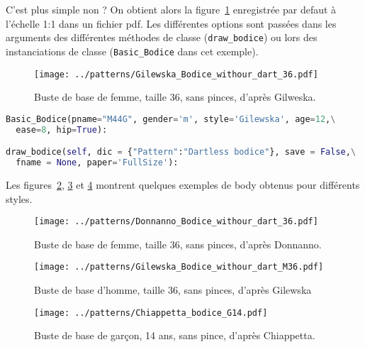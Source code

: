 \documentclass[10pt,a4paper,twoside]{report}
\begin{document}
C'est plus simple non ? On obtient alors la figure~\ref{fig:bodice_WG36} enregistrée par defaut à l'échelle 1:1 dans un fichier pdf. Les différentes options sont passées dans les arguments des différentes méthodes de classe (\texttt{draw\_bodice}) ou lors des instanciations de classe (\texttt{Basic\_Bodice} dans cet exemple).



\begin{figure}[hbtp]
\centering
\texttt{[image: ../patterns/Gilewska\_Bodice\_withour\_dart\_36.pdf]}
\caption{Buste de base de femme, taille 36, sans pinces, d'après Gilweska.}
\label{fig:bodice_WG36}
\end{figure}




\begin{lstlisting}[language=python]
Basic_Bodice(pname="M44G", gender='m', style='Gilewska', age=12,\
  ease=8, hip=True):

draw_bodice(self, dic = {"Pattern":"Dartless bodice"}, save = False,\
  fname = None, paper='FullSize'):

\end{lstlisting}

Les figures~\ref{fig:bodice_DW36}, \ref{fig:bodice_MG36} et \ref{fig:CB14} montrent quelques exemples de body obtenus pour différents styles.


\begin{figure}[hbtp]
\centering
\texttt{[image: ../patterns/Donnanno\_Bodice\_withour\_dart\_36.pdf]}
\caption{Buste de base de femme, taille 36, sans pinces, d'après Donnanno.}
\label{fig:bodice_DW36}
\end{figure}

\begin{figure}[hbtp]
\centering
\texttt{[image: ../patterns/Gilewska\_Bodice\_withour\_dart\_M36.pdf]}
\caption{Buste de base d'homme, taille 36, sans pinces, d'après Gilewska}
\label{fig:bodice_MG36}
\end{figure}

\begin{figure}[hbtp]
\centering
\texttt{[image: ../patterns/Chiappetta\_bodice\_G14.pdf]}
\caption{Buste de base de garçon, 14 ans, sans pince, d'après Chiappetta.}
\label{fig:CB14}
\end{figure}
\end{document}
